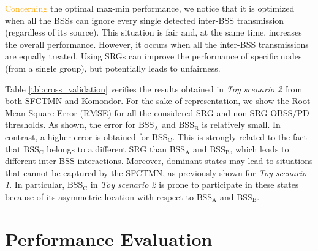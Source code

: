 \documentclass{ieeeaccess}
\begin{document}
\textcolor{orange}{Concerning} the optimal max-min performance, we notice that it is optimized when all the BSSs can ignore every single detected inter-BSS transmission (regardless of its source). This situation is fair and, at the same time, increases the overall performance. However, it occurs when all the inter-BSS transmissions are equally treated. Using SRGs can improve the performance of specific nodes (from a single group), but potentially leads to unfairness. 

Table \ref{tbl:cross_validation} verifies the results obtained in \emph{Toy scenario 2} from both SFCTMN and Komondor. For the sake of representation, we show the Root Mean Square Error (RMSE) for all the considered SRG and non-SRG OBSS/PD thresholds. As shown, the error for $\text{BSS}_\text{A}$ and $\text{BSS}_\text{B}$ is relatively small. In contrast, a higher error is obtained for $\text{BSS}_\text{C}$. This is strongly related to the fact that $\text{BSS}_\text{C}$ belongs to a different SRG than $\text{BSS}_\text{A}$ and $\text{BSS}_\text{B}$, which leads to different inter-BSS interactions. Moreover, dominant states may lead to situations that cannot be captured by the SFCTMN, as previously shown for \emph{Toy scenario 1}. In particular, $\text{BSS}_\text{C}$ in \emph{Toy scenario 2} is prone to participate in these states because of its asymmetric location with respect to $\text{BSS}_\text{A}$ and $\text{BSS}_\text{B}$.
\begin{table}[ht!]
	\centering
	\caption{Verification of the results obtained in \emph{Toy scenario 2} from the SFCTMN and Komondor.}
	\label{tbl:cross_validation}
\end{table}


\section{Performance Evaluation}
\label{section:performance_evaluation}
\end{document}

